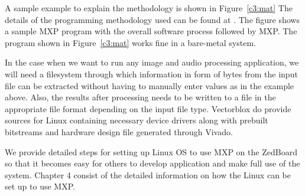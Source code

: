 A sample example to explain the methodology is shown in Figure~\ref{c3:mat} The details of the programming methodology used can be found at \cite{19}. The figure shows a sample MXP program with the overall software process followed by MXP. The program shown in Figure~\ref{c3:mat} works fine in a bare-metal system. 


In the case when we want to run any image and audio processing application, we will need a filesystem through which information in form of bytes from the input file can be extracted without having to manually enter values as in the example above. Also, the results after processing needs to be written to a file in the appropriate file format depending on the input file type. Vectorblox do provide sources for Linux containing necessary device drivers along with prebuilt bitstreams and hardware design file generated through Vivado.

We provide detailed steps for setting up Linux OS to use MXP on the ZedBoard so that it becomes easy for others to develop application and make full use of the system. Chapter 4 consist of the detailed information on how the Linux can be set up to use MXP.

